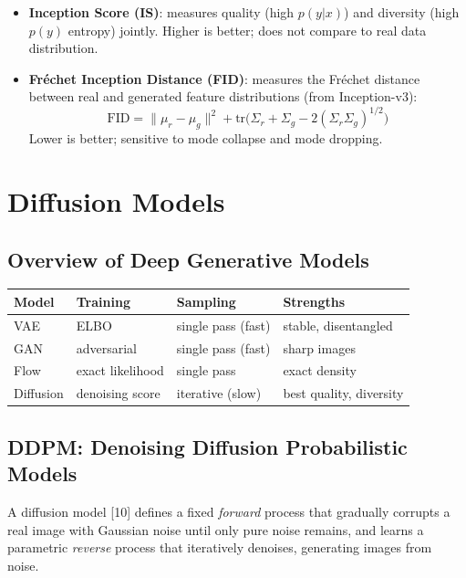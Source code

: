 \documentclass[12pt,a4paper]{report}
\begin{document}
\begin{itemize}[itemsep=2pt]
    \item \textbf{Inception Score (IS)}: measures quality (high
          $p(y|x)$) and diversity (high $p(y)$ entropy) jointly.  Higher
          is better; does not compare to real data distribution.
    \item \textbf{Fréchet Inception Distance (FID)}: measures the Fréchet
          distance between real and generated feature distributions (from
          Inception-v3):
          \[
              \mathrm{FID} = \|\mu_r - \mu_g\|^2
              + \mathrm{tr}\!\bigl(\Sigma_r + \Sigma_g
              - 2(\Sigma_r\Sigma_g)^{1/2}\bigr)
          \]
          Lower is better; sensitive to mode collapse and mode dropping.
\end{itemize}

\chapter{Diffusion Models}

\section{Overview of Deep Generative Models}

\begin{center}
\begin{tabular}{llll}
\toprule
Model & Training & Sampling & Strengths \\
\midrule
VAE    & ELBO               & single pass (fast) & stable, disentangled \\
GAN    & adversarial        & single pass (fast) & sharp images \\
Flow   & exact likelihood   & single pass        & exact density \\
Diffusion & denoising score & iterative (slow)   & best quality, diversity \\
\bottomrule
\end{tabular}
\end{center}

\section{DDPM: Denoising Diffusion Probabilistic Models}

A diffusion model [10] defines a fixed \emph{forward} process
that gradually corrupts a real image with Gaussian noise until only pure noise
remains, and learns a parametric \emph{reverse} process that iteratively
denoises, generating images from noise.
\end{document}
